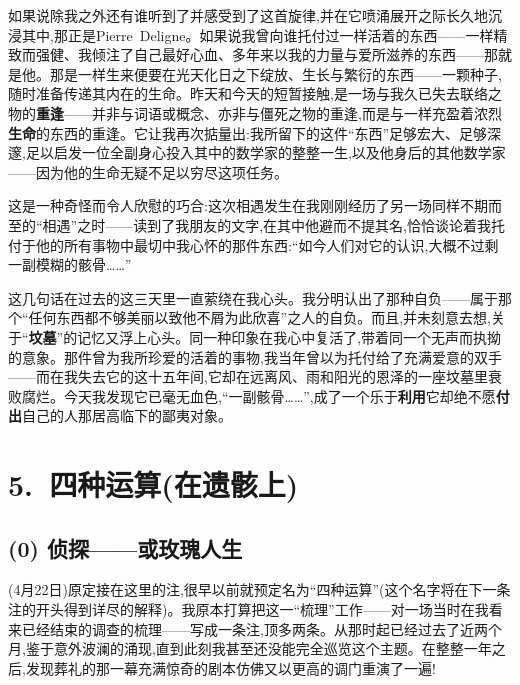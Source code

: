 如果说除我之外还有谁听到了并感受到了这首旋律,并在它喷涌展开之际长久地沉浸其中,那正是Pierre~Deligne。如果说我曾向谁托付过一样活着的东西——一样精致而强健、我倾注了自己最好心血、多年来以我的力量与爱所滋养的东西——那就是他。那是一样生来便要在光天化日之下绽放、生长与繁衍的东西——一颗种子,随时准备传递其内在的生命。昨天和今天的短暂接触,是一场与我久已失去联络之物的\textbf{重逢}——并非与词语或概念、亦非与僵死之物的重逢,而是与一样充盈着浓烈\textbf{生命}的东西的重逢\dmark{}。它让我再次掂量出:我所留下的这件“东西”足够宏大、足够深邃,足以启发一位全副身心投入其中的数学家的整整一生,以及他身后的其他数学家——因为他的生命无疑不足以穷尽这项任务。

这是一种奇怪而令人欣慰的巧合:这次相遇发生在我刚刚经历了另一场同样不期而至的“相遇”之时——读到了我朋友的文字,在其中他避而不提其名,恰恰谈论着我托付于他的所有事物中最切中我心怀的那件东西:“如今人们对它的认识,大概不过剩一副模糊的骸骨……”

这几句话在过去的这三天里一直萦绕在我心头。我分明认出了那种自负——属于那个“任何东西都不够美丽以致他不屑为此欣喜”之人的自负。而且,并未刻意去想,关于“\textbf{坟墓}”的记忆又浮上心头。同一种印象在我心中复活了,带着同一个无声而执拗的意象。那件曾为我所珍爱的活着的事物,我当年曾以为托付给了充满爱意的双手——而在我失去它的这十五年间,它却在远离风、雨和阳光的恩泽的一座坟墓里衰败腐烂。今天我发现它已毫无血色,“一副骸骨……”,成了一个乐于\textbf{利用}它却绝不愿\textbf{付出}自己的人那居高临下的鄙夷对象。

\section{5.~四种运算(在遗骸上)}

\subsection{(0) 侦探——或玫瑰人生}


\dmark{}(4月22日)原定接在这里的注,很早以前就预定名为“四种运算”(这个名字将在下一条注的开头得到详尽的解释)。我原本打算把这一“梳理”工作——对一场当时在我看来已经结束的调查的梳理——写成一条注,顶多两条。从那时起已经过去了近两个月,鉴于意外波澜的涌现,直到此刻我甚至还没能完全巡览这个主题。在整整一年之后,发现葬礼的那一幕充满惊奇的剧本仿佛又以更高的调门重演了一遍!

